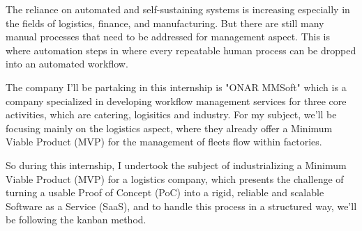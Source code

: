 The reliance on automated and self-sustaining systems is increasing especially
in the fields of logistics, finance, and manufacturing. But there are still many
manual processes that need to be addressed for management aspect. This is where
automation steps in where every repeatable human process can be dropped into an
automated workflow.

The company I'll be partaking in this internship is "ONAR MMSoft" which is a company
specialized in developing workflow management services for three core activities,
which are catering, logisitics and industry. For my subject, we'll be focusing mainly
on the logistics aspect, where they already offer a Minimum Viable Product (MVP)
for the management of fleets flow within factories.

So during this internship, I undertook the subject of industrializing a Minimum
Viable Product (MVP) for a logistics company, which presents the challenge of
turning a usable Proof of Concept (PoC) into a rigid, reliable and scalable Software
as a Service (SaaS), and to handle this process in a structured way, we'll be following
the kanban method.
\newpage
